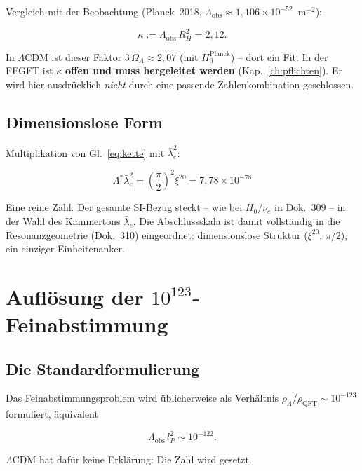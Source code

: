 Vergleich mit der Beobachtung (Planck~2018,
$\Lambda_\text{obs} \approx 1{,}106\times10^{-52}$~m$^{-2}$):

\begin{equation}
  \kappa := \Lambda_\text{obs}\,R_H^{2} = 2{,}12.
  \label{eq:kappa}
\end{equation}

In $\Lambda$CDM ist dieser Faktor $3\,\Omega_\Lambda \approx 2{,}07$
(mit $H_0^\text{Planck}$) -- dort ein Fit. In der FFGFT ist $\kappa$
\textbf{offen und muss hergeleitet werden} (Kap.~\ref{ch:pflichten}). Er wird hier
ausdrücklich \emph{nicht} durch eine passende Zahlenkombination
geschlossen.

\section{Dimensionslose Form}

Multiplikation von Gl.~\eqref{eq:kette} mit $\bar\lambda_e^2$:

\begin{equation}
  \boxed{\;\Lambda^{*}\bar\lambda_e^{2}
  = \left(\frac{\pi}{2}\right)^{2}\xi^{20}
  = 7{,}78\times10^{-78}\;}
  \label{eq:dimlos}
\end{equation}

Eine reine Zahl. Der gesamte SI-Bezug steckt -- wie bei $H_0/\nu_e$
in Dok.~309 -- in der Wahl des Kammertons $\bar\lambda_e$. Die
Abschlussskala ist damit vollständig in die Resonanzgeometrie
(Dok.~310) eingeordnet: dimensionslose Struktur ($\xi^{20}$, $\pi/2$),
ein einziger Einheitenanker.

\chapter{Auflösung der $10^{123}$-Feinabstimmung}

\section{Die Standardformulierung}

Das Feinabstimmungsproblem wird üblicherweise als Verhältnis
$\rho_\Lambda/\rho_\text{QFT} \sim 10^{-123}$ formuliert, äquivalent

\[
  \Lambda_\text{obs}\,l_P^{2} \sim 10^{-122}.
\]

$\Lambda$CDM hat dafür keine Erklärung: Die Zahl wird gesetzt.

